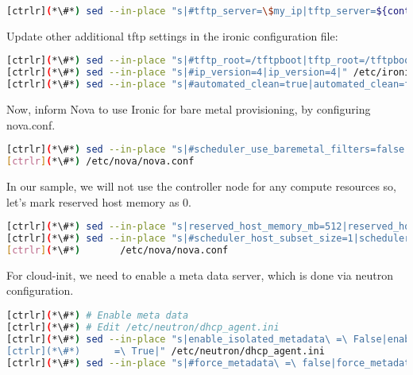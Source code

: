 
\begin{lstlisting}[language=bash,keywords={}]
[ctrlr](*\#*) sed --in-place "s|#tftp_server=\$my_ip|tftp_server=${controller_ip}|" /etc/ironic/ironic.conf
\end{lstlisting} 

	Update other additional tftp settings in the ironic configuration file:


\begin{lstlisting}[language=bash,keywords={}]
[ctrlr](*\#*) sed --in-place "s|#tftp_root=/tftpboot|tftp_root=/tftpboot|" /etc/ironic/ironic.conf
[ctrlr](*\#*) sed --in-place "s|#ip_version=4|ip_version=4|" /etc/ironic/ironic.conf
[ctrlr](*\#*) sed --in-place "s|#automated_clean=true|automated_clean=false|" /etc/ironic/ironic.conf
\end{lstlisting} 

	Now, inform Nova to use Ironic for bare metal provisioning, by configuring nova.conf.


\begin{lstlisting}[language=bash,keywords={}]
[ctrlr](*\#*) sed --in-place "s|#scheduler_use_baremetal_filters=false|scheduler_use_baremetal_filters=true|" \
[ctrlr](*\#*) /etc/nova/nova.conf
\end{lstlisting} 

	In our sample, we will not use the controller node for any compute resources so, let's mark reserved host memory as 0.


\begin{lstlisting}[language=bash,keywords={}]
[ctrlr](*\#*) sed --in-place "s|reserved_host_memory_mb=512|reserved_host_memory_mb=0|" /etc/nova/nova.conf
[ctrlr](*\#*) sed --in-place "s|#scheduler_host_subset_size=1|scheduler_host_subset_size=9999999|" \
[ctrlr](*\#*)       /etc/nova/nova.conf
\end{lstlisting} 

	For cloud-init, we need to enable a meta data server, which is done via neutron configuration.


\begin{lstlisting}[language=bash,keywords={}]
[ctrlr](*\#*) # Enable meta data
[ctrlr](*\#*) # Edit /etc/neutron/dhcp_agent.ini
[ctrlr](*\#*) sed --in-place "s|enable_isolated_metadata\ =\ False|enable_isolated_metadata\ \
[ctrlr](*\#*)      =\ True|" /etc/neutron/dhcp_agent.ini
[ctrlr](*\#*) sed --in-place "s|#force_metadata\ =\ false|force_metadata\ =\ \True|" /etc/neutron/dhcp_agent.ini
\end{lstlisting} 

